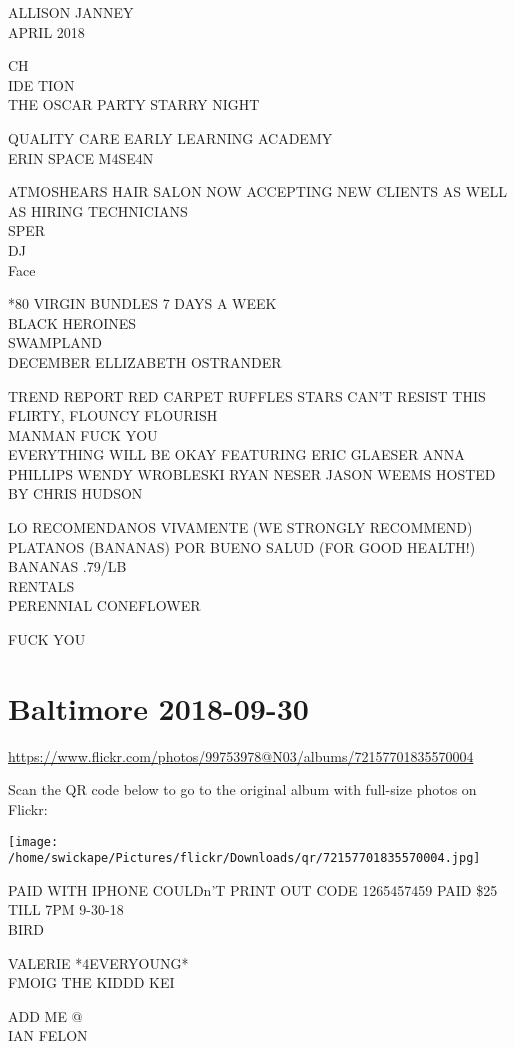 \documentclass[10pt,letterpaper]{article}
\begin{document}
ALLISON JANNEY\\
APRIL 2018

CH\\
IDE TION\\
THE OSCAR PARTY STARRY NIGHT

QUALITY CARE EARLY LEARNING ACADEMY\\
ERIN SPACE M4SE4N

ATMOSHEARS HAIR SALON NOW ACCEPTING NEW CLIENTS AS WELL AS HIRING TECHNICIANS\\
SPER\\
DJ\\
Face

*80 VIRGIN BUNDLES 7 DAYS A WEEK\\
BLACK HEROINES\\
SWAMPLAND\\
DECEMBER ELLIZABETH OSTRANDER

TREND REPORT RED CARPET RUFFLES STARS CAN'T RESIST THIS FLIRTY, FLOUNCY FLOURISH\\
MANMAN FUCK YOU\\
EVERYTHING WILL BE OKAY FEATURING ERIC GLAESER ANNA PHILLIPS WENDY WROBLESKI RYAN NESER JASON WEEMS HOSTED BY CHRIS HUDSON

LO RECOMENDANOS VIVAMENTE (WE STRONGLY RECOMMEND) PLATANOS (BANANAS) POR BUENO SALUD (FOR GOOD HEALTH!) BANANAS .79/LB\\
RENTALS\\
PERENNIAL CONEFLOWER

FUCK YOU


\section*{Baltimore 2018-09-30}

\url{https://www.flickr.com/photos/99753978@N03/albums/72157701835570004}

Scan the QR code below to go to the original album with full-size photos on Flickr:

\texttt{[image: /home/swickape/Pictures/flickr/Downloads/qr/72157701835570004.jpg]}


PAID WITH IPHONE COULDn'T PRINT OUT CODE 1265457459 PAID \$25 TILL 7PM 9{-}30{-}18\\
BIRD

VALERIE *4EVERYOUNG*\\
FMOIG THE KIDDD KEI

ADD ME @\\
IAN FELON
\end{document}
